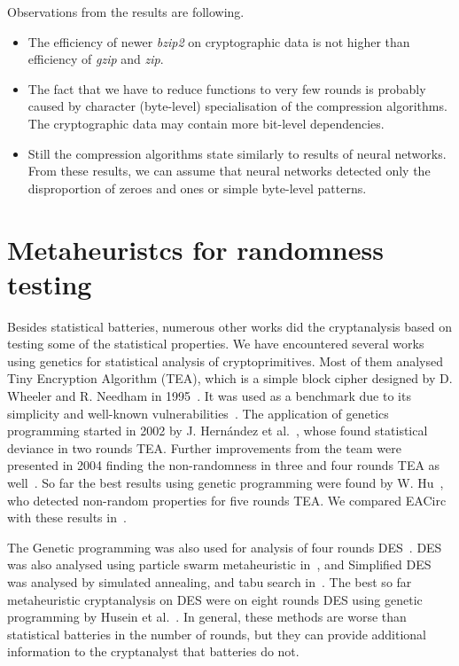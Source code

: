 \documentclass[
  print, %
  Table,   %
  nolof,     %
  nolot,     %
  11pt, %
  oneside  %
]{fithesis3}
\begin{document}
Observations from the results are following.

\begin{itemize}
    \item The efficiency of newer \textit{bzip2} on cryptographic data is not higher than efficiency of \textit{gzip} and \textit{zip}.
    \item The fact that we have to reduce functions to very few rounds is probably caused by character (byte-level) specialisation of the compression algorithms. The cryptographic data may contain more bit-level dependencies.
    \item Still the compression algorithms state similarly to results of neural networks. From these results, we can assume that neural networks detected only the disproportion of zeroes and ones or simple byte-level patterns.
\end{itemize}


\section{Metaheuristcs for randomness testing}
\label{sec:relatwork-paper}

Besides statistical batteries, numerous other works did the cryptanalysis based on testing some of the statistical properties. We have encountered several works using genetics for statistical analysis of cryptoprimitives. Most of them analysed Tiny Encryption Algorithm (TEA), which is a simple block cipher designed by D. Wheeler and R. Needham in 1995~\cite{TEA}. It was used as a benchmark due to its simplicity and well-known vulnerabilities~\cite{TEAAttack}. The application of genetics programming started in 2002 by J. Hernández et al.~\cite{twoRoundsTea}, whose found statistical deviance in two rounds TEA. Further improvements from the team were presented in 2004 finding the non-randomness in three and four rounds TEA as well~\cite{fourRoundsTea}. So far the best results using genetic programming were found by W. Hu~\cite{fiveRoundsTea}, who detected non-random properties for five rounds TEA. We compared EACirc with these results in~\cite{2016-infocommunications-kubicek}.

The Genetic programming was also used for analysis of four rounds DES~\cite{song2007cryptanalysis}. DES was also analysed using particle swarm metaheuristic in~\cite{shahzad2009cryptanalysis}, and Simplified DES was analysed by simulated annealing, and tabu search in~\cite{nalini2005cryptanalysis}. The best so far metaheuristic cryptanalysis on DES were on eight rounds DES using genetic programming by Husein et al.~\cite{husein2007genetic}. In general, these methods are worse than statistical batteries in the number of rounds, but they can provide additional information to the cryptanalyst that batteries do not.
\end{document}
